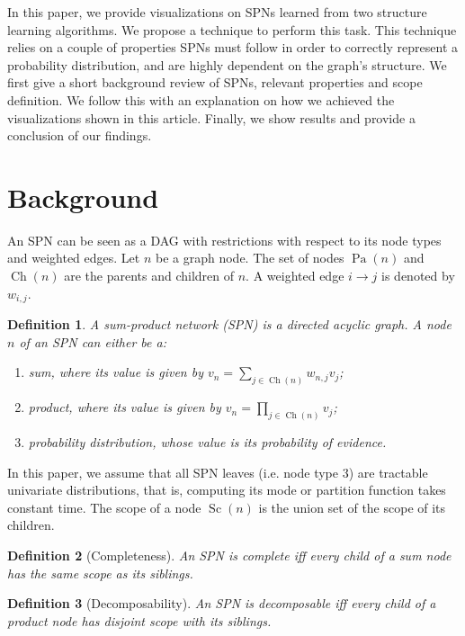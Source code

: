 \documentclass{article}
\newtheorem{definition}{Definition}
\DeclareMathOperator*{\Ch}{\text{Ch}}
\DeclareMathOperator*{\Pa}{\text{Pa}}
\DeclareMathOperator*{\Sc}{\text{Sc}}
\begin{document}
In this paper, we provide visualizations on SPNs learned from two structure learning algorithms. We
propose a technique to perform this task. This technique relies on a couple of properties SPNs must
follow in order to correctly represent a probability distribution, and are highly dependent on the
graph's structure. We first give a short background review of SPNs, relevant properties and scope
definition. We follow this with an explanation on how we achieved the visualizations shown in this
article. Finally, we show results and provide a conclusion of our findings.

\section{Background}
\label{sec:back}

An SPN can be seen as a DAG with restrictions with respect to its node types and weighted edges.
Let $n$ be a graph node. The set of nodes $\Pa(n)$ and $\Ch(n)$ are the parents and children of
$n$. A weighted edge $i\to j$ is denoted by $w_{i,j}$.

\begin{definition}
  A sum-product network (SPN) is a directed acyclic graph. A node $n$ of an SPN can either be a:
  \begin{enumerate}\setlength\itemsep{0em}
    \item sum, where its value is given by $v_n=\sum_{j\in\Ch(n)}w_{n,j}v_j$;
    \item product, where its value is given by $v_n=\prod_{j\in\Ch(n)}v_j$;
    \item probability distribution, whose value is its probability of evidence.
  \end{enumerate}
\end{definition}

In this paper, we assume that all SPN leaves (i.e. node type 3) are tractable univariate
distributions, that is, computing its mode or partition function takes constant time. The scope of
a node $\Sc(n)$ is the union set of the scope of its children.

\begin{definition}[Completeness]
  An SPN is complete iff every child of a sum node has the same scope as its siblings.
\end{definition}

\begin{definition}[Decomposability]
  An SPN is decomposable iff every child of a product node has disjoint scope with its siblings.
\end{definition}
\end{document}
